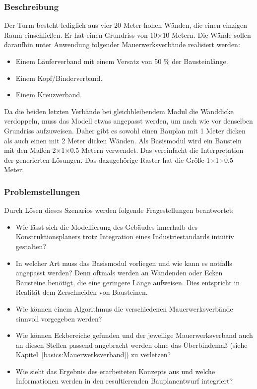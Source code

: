 \subsubsection*{Beschreibung}
Der Turm besteht lediglich aus vier 20 Meter hohen Wänden, die einen einzigen Raum einschließen.
Er hat einen Grundriss von 10$\times$10 Metern.
Die Wände sollen daraufhin unter Anwendung folgender Mauerwerksverbände realisiert werden:
\begin{itemize}
  \item Einem Läuferverband mit einem Versatz von 50 \% der Bausteinlänge.
  \item Einem Kopf/Binderverband.
  \item Einem Kreuzverband.
\end{itemize}
Da die beiden letzten Verbände bei gleichbleibendem Modul die Wanddicke verdoppeln, muss das Modell etwas angepasst werden, um nach wie vor denselben Grundriss aufzuweisen.
Daher gibt es sowohl einen Bauplan mit 1 Meter dicken als auch einen mit 2 Meter dicken Wänden.
Als Basismodul wird ein Baustein mit den Maßen 2$\times$1$\times$0.5 Metern verwendet.
Das vereinfacht die Interpretation der generierten Lösungen.
Das dazugehörige Raster hat die Größe 1$\times$1$\times$0.5 Meter.

\subsubsection*{Problemstellungen}
Durch Lösen dieses Szenarios werden folgende Fragestellungen beantwortet:
\begin{itemize}
  \item Wie lässt sich die Modellierung des Gebäudes innerhalb des Konstruktionsplaners trotz Integration eines Industriestandards intuitiv gestalten?
  \item In welcher Art muss das Basismodul vorliegen und wie kann es notfalls angepasst werden? 
  Denn oftmals werden an Wandenden oder Ecken Bausteine benötigt, die eine geringere Länge aufweisen.
  Dies entspricht in Realität dem Zerschneiden von Bausteinen.
  \item Wie können einem Algorithmus die verschiedenen Mauerwerksverbände sinnvoll vorgegeben werden?
  \item Wie können Eckbereiche gefunden und der jeweilige Mauerwerksverband auch an diesen Stellen passend angebracht werden ohne das Überbindemaß (siehe Kapitel~\ref{basics:Mauerwerksverband}) zu verletzen?
  \item Wie sieht das Ergebnis des erarbeiteten Konzepts aus und welche Informationen werden in den resultierenden Bauplanentwurf integriert?
\end{itemize}

